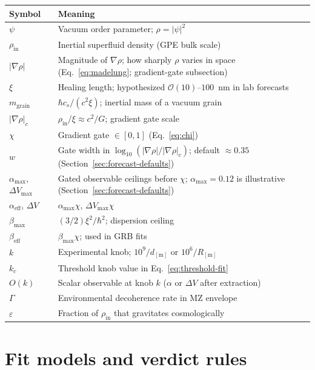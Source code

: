 \documentclass[11pt,a4paper]{article}
\begin{document}
\begin{table}[htbp]
  \centering
  \small
  \begin{tabular}{@{}ll@{}}
    \toprule
    Symbol & Meaning \\
    \midrule
    $\psi$ & Vacuum order parameter; $\rho = |\psi|^2$ \\
    $\rho_{\mathrm{in}}$ & Inertial superfluid density (GPE bulk scale) \\
    $|\nabla\rho|$ & Magnitude of $\nabla\rho$; how sharply $\rho$ varies in space (Eq.~\ref{eq:madelung}; gradient-gate subsection) \\
    $\xi$ & Healing length; hypothesized $\mathcal{O}(10)$--$100$~nm in lab forecasts \\
    $m_{\mathrm{grain}}$ & $\hbar c_s/(c^2\xi)$; inertial mass of a vacuum grain \\
    $|\nabla\rho|_c$ & $\rho_{\mathrm{in}}/\xi \approx c^2/G$; gradient gate scale \\
    $\chi$ & Gradient gate $\in [0,1]$ (Eq.~\ref{eq:chi}) \\
    $w$ & Gate width in $\log_{10}(|\nabla\rho|/|\nabla\rho|_c)$; default $\approx 0.35$ (Section~\ref{sec:forecast-defaults}) \\
    $\alpha_{\max}$, $\Delta V_{\max}$ & Gated observable ceilings before $\chi$; $\alpha_{\max}=0.12$ is illustrative (Section~\ref{sec:forecast-defaults}) \\
    $\alpha_{\mathrm{eff}}$, $\Delta V$ & $\alpha_{\max}\chi$, $\Delta V_{\max}\chi$ \\
    $\beta_{\max}$ & $(3/2)\xi^2/\hbar^2$; dispersion ceiling \\
    $\beta_{\mathrm{eff}}$ & $\beta_{\max}\chi$; used in GRB fits \\
    $k$ & Experimental knob; $10^9/d_{[\mathrm{m}]}$ or $10^6/R_{[\mathrm{m}]}$ \\
    $k_c$ & Threshold knob value in Eq.~\ref{eq:threshold-fit} \\
    $O(k)$ & Scalar observable at knob $k$ ($\alpha$ or $\Delta V$ after extraction) \\
    $\Gamma$ & Environmental decoherence rate in MZ envelope \\
    $\varepsilon$ & Fraction of $\rho_{\mathrm{in}}$ that gravitates cosmologically \\
    \bottomrule
  \end{tabular}
\end{table}

\section{Fit models and verdict rules}
\label{app:fits}
\end{document}
